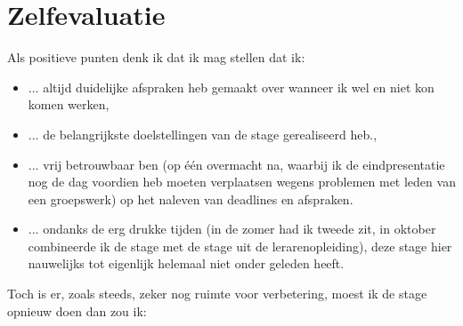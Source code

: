 \documentclass[a4paper,11pt]{article}
\theoremstyle{definition}
\begin{document}
\section{Zelfevaluatie}
Als positieve punten denk ik dat ik mag stellen dat ik:
\begin{itemize}
  \item ... altijd duidelijke afspraken heb gemaakt over wanneer ik wel en niet kon 
  komen werken,
  \item ... de belangrijkste doelstellingen van de stage gerealiseerd heb.,
  \item ... vrij betrouwbaar ben (op één overmacht na, waarbij ik de eindpresentatie nog de dag voordien heb
  moeten verplaatsen wegens problemen met leden van een groepswerk) op het 
  naleven van deadlines en afspraken.
  \item ... ondanks de erg drukke tijden (in de zomer had ik tweede zit, in oktober combineerde ik de stage
  met de stage uit de lerarenopleiding), deze stage hier nauwelijks tot eigenlijk helemaal niet onder geleden heeft. 
\end{itemize}
Toch is er, zoals steeds, zeker nog ruimte voor verbetering, moest ik de stage 
opnieuw doen dan zou ik:
\end{document}
